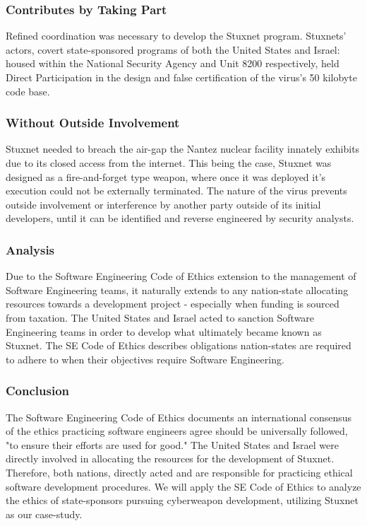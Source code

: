 \documentclass[12pt]{article}
\begin{document}
\begin{multicols}{2}
\subsubsection{Contributes by Taking Part}

Refined coordination was necessary to develop the Stuxnet program. Stuxnets' actors, covert state-sponsored programs of both the United States and Israel: housed within the National Security Agency and Unit 8200 respectively, held Direct Participation in the design and false certification of the virus's 50 kilobyte code base.\cite{NationalSecurityAgencyAndUnit8200}\cite{w32.stuxnetDossier}

\subsubsection{Without Outside Involvement}

Stuxnet needed to breach the air-gap the Nantez nuclear facility innately exhibits due to its closed access from the internet. This being the case, Stuxnet was designed as a fire-and-forget type weapon, where once it was deployed it's execution could not be externally terminated. The nature of the virus prevents outside involvement or interference by another party outside of its initial developers, until it can be identified and reverse engineered by security analysts.\cite{stuxnetFireandForget}


\subsubsection{Analysis}
Due to the Software Engineering Code of Ethics extension to the management of Software Engineering teams, it naturally extends to any nation-state allocating resources towards a development project - especially when funding is sourced from taxation. The United States and Israel acted to sanction Software Engineering teams in order to develop what ultimately became known as Stuxnet. The SE Code of Ethics describes obligations nation-states are required to adhere to when their objectives require Software Engineering.

\subsubsection{Conclusion}

The Software Engineering Code of Ethics documents an international consensus of the ethics practicing software engineers agree should be universally followed, "to ensure their efforts are used for good."\cite{softwareEngineeringCodeOfEthics} The United States and Israel were directly involved in allocating the resources for the development of Stuxnet. Therefore, both nations, directly acted and are responsible for practicing ethical software development procedures. We will apply the SE Code of Ethics to analyze the ethics of state-sponsors pursuing cyberweapon development, utilizing Stuxnet as our case-study.


\end{multicols}
\end{document}
